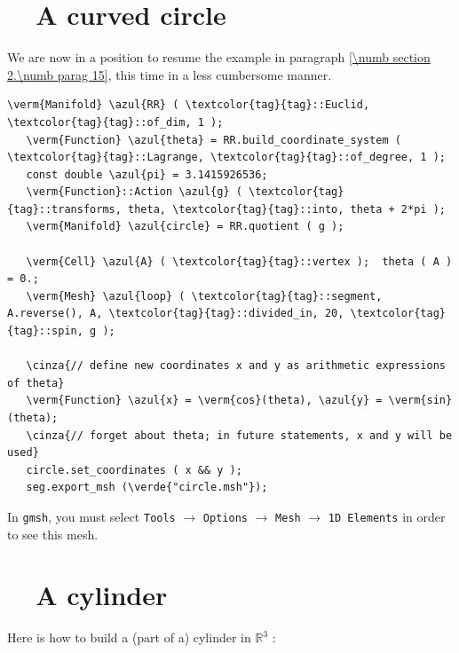 \section{~~A curved circle}\label{\numb section 7.\numb parag 2}

We are now in a position to resume the example in paragraph \ref{\numb section 2.\numb parag 15},
this time in a less cumbersome manner.

\begin{Verbatim}[commandchars=\\\{\},formatcom=\small\tt,frame=single,
   label=parag-\ref{\numb section 7.\numb parag 2}.cpp,rulecolor=\color{coment},
   baselinestretch=0.94,framesep=2mm                                            ]
   \verm{Manifold} \azul{RR} ( \textcolor{tag}{tag}::Euclid, \textcolor{tag}{tag}::of_dim, 1 );
   \verm{Function} \azul{theta} = RR.build_coordinate_system ( \textcolor{tag}{tag}::Lagrange, \textcolor{tag}{tag}::of_degree, 1 );
   const double \azul{pi} = 3.1415926536;
   \verm{Function}::Action \azul{g} ( \textcolor{tag}{tag}::transforms, theta, \textcolor{tag}{tag}::into, theta + 2*pi );
   \verm{Manifold} \azul{circle} = RR.quotient ( g );

   \verm{Cell} \azul{A} ( \textcolor{tag}{tag}::vertex );  theta ( A ) = 0.;
   \verm{Mesh} \azul{loop} ( \textcolor{tag}{tag}::segment, A.reverse(), A, \textcolor{tag}{tag}::divided_in, 20, \textcolor{tag}{tag}::spin, g );

   \cinza{// define new coordinates x and y as arithmetic expressions of theta}
   \verm{Function} \azul{x} = \verm{cos}(theta), \azul{y} = \verm{sin}(theta);
   \cinza{// forget about theta; in future statements, x and y will be used}
   circle.set_coordinates ( x && y );
   seg.export_msh (\verde{"circle.msh"});
\end{Verbatim}

In {\tt gmsh}, you must select {\small\tt Tools} $\to$ {\small\tt Options} $\to$
{\small\tt Mesh} $\to$ {\small\tt 1D Elements} in order to see this mesh.


\section{~~A cylinder}\label{\numb section 7.\numb parag 3}

Here is how to build a (part of a) cylinder in $ \mathbb{R}^3 $ :

